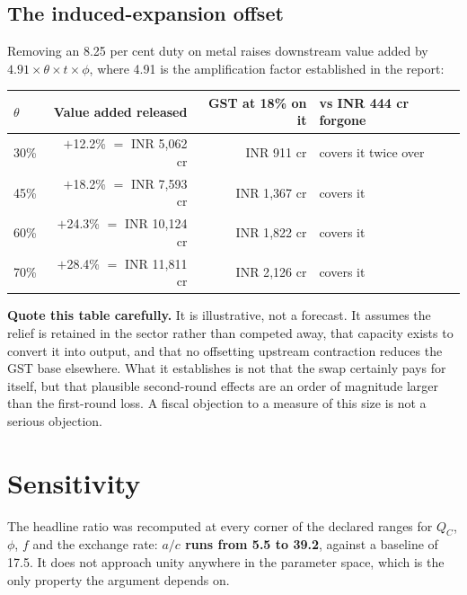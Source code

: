 \documentclass[11pt, a4paper]{article}
\begin{document}
\subsection{The induced-expansion offset}
\label{sec:offset}

Removing an 8.25 per cent duty on metal raises downstream value added by
$4.91 \times \theta \times t \times \phi$, where 4.91 is the amplification factor
established in the report:

\begin{table}[H]
\centering
\small
\begin{tabular}{lrrl}
\toprule
$\theta$ & \textbf{Value added released} & \textbf{GST at 18\% on it} & \textbf{vs INR 444 cr forgone} \\
\midrule
30\% & $+$12.2\% $=$ INR 5{,}062 cr & INR 911 cr & covers it twice over \\
45\% & $+$18.2\% $=$ INR 7{,}593 cr & INR 1{,}367 cr & covers it \\
60\% & $+$24.3\% $=$ INR 10{,}124 cr & INR 1{,}822 cr & covers it \\
70\% & $+$28.4\% $=$ INR 11{,}811 cr & INR 2{,}126 cr & covers it \\
\bottomrule
\end{tabular}
\end{table}

\begin{keybox}
\textbf{Quote this table carefully.} It is illustrative, not a forecast. It assumes
the relief is retained in the sector rather than competed away, that capacity exists
to convert it into output, and that no offsetting upstream contraction reduces the
GST base elsewhere. What it establishes is not that the swap certainly pays for
itself, but that plausible second-round effects are an order of magnitude larger than
the first-round loss. A fiscal objection to a measure of this size is not a serious
objection.
\end{keybox}

\section{Sensitivity}

The headline ratio was recomputed at every corner of the declared ranges for $Q_C$,
$\phi$, $f$ and the exchange rate: \textbf{$a/c$ runs from 5.5 to 39.2}, against a
baseline of 17.5. It does not approach unity anywhere in the parameter space, which
is the only property the argument depends on.
\end{document}

